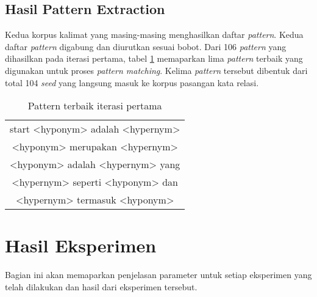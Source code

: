 \subsection{Hasil Pattern Extraction}
Kedua korpus kalimat yang masing-masing menghasilkan daftar \textit{pattern}. Kedua daftar \textit{pattern} digabung dan diurutkan sesuai bobot. Dari 106 \textit{pattern} yang dihasilkan pada iterasi pertama, tabel \ref{table:pattern1} memaparkan lima \textit{pattern} terbaik yang digunakan untuk proses \textit{pattern matching}. Kelima \textit{pattern} tersebut dibentuk dari total 104 \textit{seed} yang langsung masuk ke korpus pasangan kata relasi.
\begin{table}
  \centering
  \caption{Pattern terbaik iterasi pertama}
  \label{table:pattern1}
  \begin{tabular}{|c|}
    \hline
      start <hyponym> adalah <hypernym> \\
      <hyponym> merupakan <hypernym> \\ 
      <hyponym> adalah <hypernym> yang \\
      <hypernym> seperti <hyponym> dan \\
      <hypernym> termasuk <hyponym> \\ \hline
  \end{tabular}
\end{table}


\section{Hasil Eksperimen}
Bagian ini akan memaparkan penjelasan parameter untuk setiap eksperimen yang telah dilakukan dan hasil dari eksperimen tersebut. 

